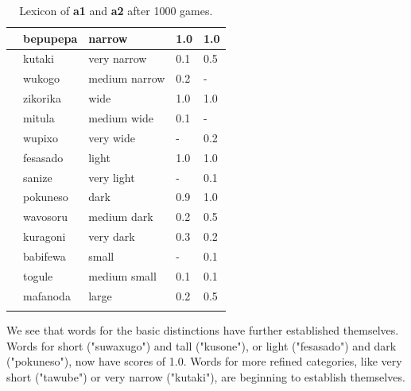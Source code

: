 \begin{table}
\begin{center}
\begin{tabular}{ l  l  l  l  l }
\lsptoprule
[WIDTH 0.0-0.5]&bepupepa&narrow & 1.0&1.0\\ \midrule
 [WIDTH 0.0-0.25]&kutaki&very narrow & 0.1&0.5\\ \midrule
 [WIDTH 0.25-0.5]&wukogo&medium narrow & 0.2&-\\ \midrule
[WIDTH 0.5-1.0]&zikorika&wide & 1.0&1.0\\ \midrule
 [WIDTH 0.5-0.75]&mitula&medium wide &0.1&-\\ \midrule
 [WIDTH 0.75-1.0]&wupixo&very wide & -&0.2\\ \midrule
[GRAY 0.0-0.5]&fesasado&light & 1.0&1.0\\ \midrule
 [GRAY 0.0-0.25]&sanize&very light & -&0.1\\ \midrule
[GRAY 0.5-1.0]&pokuneso&dark &0.9&1.0\\ \midrule
 [GRAY 0.5-0.75]&wavosoru&medium dark & 0.2&0.5\\ \midrule
 [GRAY 0.75-1.0]&kuragoni&very dark &0.3&0.2\\ \midrule
[AREA 0.0-0.5]&babifewa&small & -&0.1\\ \midrule
 [AREA 0.25-0.5]&togule&medium small & 0.1&0.1\\ \midrule
[AREA 0.5-1.0]&mafanoda&large & 0.2&0.5\\ \midrule
\lspbottomrule
\end{tabular}
\caption{\label{tab:lex500b} Lexicon of {\bf a1} and {\bf a2} after 1000 games.}
\end{center}
\end{table}

We see that words for the basic distinctions have further established
themselves. Words for short ("suwaxugo") and tall ("kusone"), or light ("fesasado") and dark 
("pokuneso"), now have scores of 1.0. Words for more refined categories, like very short ("tawube") or 
very narrow ("kutaki"), are beginning to establish themselves.  

